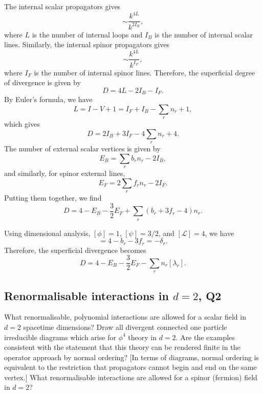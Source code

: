 \begin{solution}
    The internal scalar propagators gives
    \begin{equation}
        \sim \frac{k^{4L}}{k^{2I_B}},
    \end{equation}
    where $L$ is the number of internal loops and $I_B$ is the number of internal scalar lines. Similarly, the internal spinor propagators gives
    \begin{equation}
        \sim \frac{k^{4L}}{k^{I_F}},
    \end{equation}
    where $I_F$ is the number of internal spinor lines. Therefore, the superficial degree of divergence is given by
    \begin{equation}
        D = 4L - 2I_B - I_F.
    \end{equation}
    By Euler's formula, we have
    \begin{equation}
        L = I -V+1 = I_F +I_B - \sum_rn_r+1,
    \end{equation}
    which gives
    \begin{equation}
        D = 2I_B + 3I_F - 4\sum_r n_r + 4.
    \end{equation}
    The number of external scalar vertices is given by  
    \begin{equation}
        E_B = \sum_r b_rn_r - 2I_B,
    \end{equation}
    and similarly, for spinor external lines,
    \begin{equation}
        E_F = 2\sum_rf_r n_r - 2I_F.
    \end{equation}
    Putting them together, we find
    \begin{equation}
        D = 4 - E_B - \frac{3}{2}E_F + \sum_r(b_r+3f_r-4)n_r.
    \end{equation}

    Using dimensional analysis, $[\phi] = 1$, $[\psi] = 3/2$, and $[\mathcal{L}] = 4$, we have
    \begin{equation}
        [\lambda_r] = 4 - b_r - 3f_r = -\delta_r.
    \end{equation}
    Therefore, the superficial divergence becomes
    \begin{equation}
        D = 4-E_B - \frac{3}{2}E_F - \sum_rn_r[\lambda_r].
    \end{equation}
\end{solution}

\subsection{Renormalisable interactions in $d=2$, Q2}
What renormalisable, polynomial interactions are allowed for a scalar field in $d=2$ spacetime dimensions? Draw all divergent connected one particle irreducible diagrams which arise for $\phi^4$ theory in $d=2$. Are the examples consistent with the statement that this theory can be rendered finite in the operator approach by normal ordering? [In terms of diagrams, normal ordering is equivalent to the restriction that propagators cannot begin and end on the same vertex.] What renormalisable interactions are allowed for a spinor (fermion) field in $d=2$?

